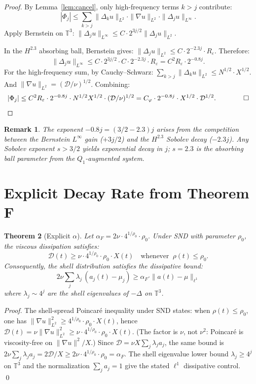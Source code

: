 \documentclass[11pt]{article}
\newtheorem{theorem}{Theorem}[section]
\newtheorem{remark}[theorem]{Remark}
\begin{document}
\begin{proof}
By Lemma~\ref{lem:cancel}, only high-frequency terms $k > j$ contribute:
\[
|\Phi_j| \leq \sum_{k>j}\|\Delta_k u\|_{L^2}\cdot\|\nabla u\|_{L^2}
\cdot\|\Delta_j u\|_{L^\infty}.
\]
Apply Bernstein on $\mathbb{T}^3$:
$\|\Delta_j u\|_{L^\infty} \leq C\cdot 2^{3j/2}\|\Delta_j u\|_{L^2}$.

In the $H^{2.3}$ absorbing ball, Bernstein gives:
$\|\Delta_j u\|_{L^2} \leq C\cdot 2^{-2.3j}\cdot R_\varepsilon$.
Therefore:
\[
\|\Delta_j u\|_{L^\infty} \leq C\cdot 2^{3j/2}\cdot C\cdot 2^{-2.3j}\cdot R_\varepsilon
= C^2 R_\varepsilon\cdot 2^{-0.8j}.
\]
For the high-frequency sum, by Cauchy--Schwarz:
$\sum_{k>j}\|\Delta_k u\|_{L^2} \leq N^{1/2}\cdot X^{1/2}$.
And $\|\nabla u\|_{L^2} = (\mathcal{D}/\nu)^{1/2}$.
Combining:
\[
|\Phi_j| \leq C^2 R_\varepsilon\cdot 2^{-0.8j}\cdot N^{1/2} X^{1/2}\cdot (\mathcal{D}/\nu)^{1/2}
= C_\varphi\cdot 2^{-0.8j}\cdot X^{1/2}\cdot\mathcal{D}^{1/2}. \qquad\qed
\]
\end{proof}

\begin{remark}
The exponent $-0.8j = (3/2 - 2.3)j$ arises from the competition between
the Bernstein $L^\infty$ gain ($+3j/2$) and the $H^{2.3}$ Sobolev decay ($-2.3j$).
Any Sobolev exponent $s > 3/2$ yields exponential decay in $j$; $s = 2.3$
is the absorbing ball parameter from the $Q_1$-augmented system.
\end{remark}

\section{Explicit Decay Rate from Theorem F}

\begin{theorem}[Explicit $\alpha$]\label{thm:alpha}
Let $\alpha_F = 2\nu\cdot 4^{1/\rho_0}\cdot\rho_0$.
Under SND with parameter $\rho_0$, the viscous dissipation satisfies:
\[
\mathcal{D}(t) \geq \nu\cdot 4^{1/\rho_0}\cdot\rho_0\cdot X(t)
\quad\text{whenever }\ \rho(t)\leq\rho_0.
\]
Consequently, the shell distribution satisfies the dissipative bound:
\[
2\nu\sum_j \lambda_j\,(a_j(t)-\mu_j) \geq \alpha_F\cdot\|a(t)-\mu\|_{\ell^1}
\]
where $\lambda_j\sim 4^j$ are the shell eigenvalues of $-\Delta$ on $\mathbb{T}^3$.
\end{theorem}

\begin{proof}
The shell-spread Poincar\'{e} inequality under SND
states: when $\rho(t)\leq\rho_0$, one has
$\|\nabla u\|_{L^2}^2\geq 4^{1/\rho_0}\cdot\rho_0\cdot X(t)$, hence
$\mathcal{D}(t)=\nu\|\nabla u\|_{L^2}^2\geq\nu\cdot 4^{1/\rho_0}\cdot\rho_0\cdot X(t)$.
(The factor is $\nu$, not $\nu^2$: Poincar\'e is viscosity-free on $\|\nabla u\|^2/X$.)
Since $\mathcal{D}=\nu X\sum_j\lambda_j a_j$, the same bound is
$2\nu\sum_j\lambda_j a_j=2\mathcal{D}/X\geq 2\nu\cdot 4^{1/\rho_0}\cdot\rho_0=\alpha_F$.
The shell eigenvalue lower bound $\lambda_j\geq 4^j$ on $\mathbb{T}^3$
and the normalization $\sum_j a_j = 1$ give the stated $\ell^1$ dissipative control.
\qed
\end{proof}
\end{document}

